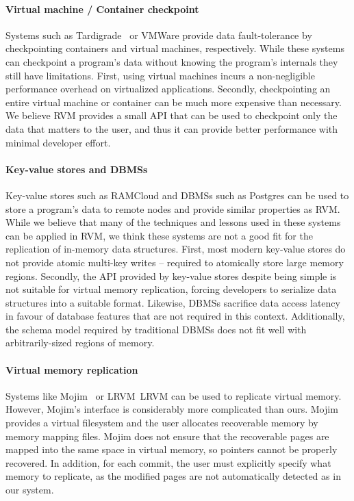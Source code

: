 \paragraph {\bf Virtual machine / Container checkpoint} Systems such as
Tardigrade~\cite{Tardigrade} or VMWare provide data fault-tolerance by
checkpointing containers and virtual machines, respectively.  While these
systems can checkpoint a program's data without knowing the program's internals
they still have limitations.  First, using virtual machines incurs a
non-negligible performance overhead on virtualized applications. Secondly,
checkpointing an entire virtual machine or container can be much more expensive
than necessary.  We believe RVM provides a small API that can be used to
checkpoint only the data that matters to the user, and thus it can provide
better performance with minimal developer effort.

\paragraph {\bf Key-value stores and DBMSs} Key-value stores such as RAMCloud
and DBMSs such as Postgres can be used to store a program's data to remote
nodes and provide similar properties as RVM. While we believe that many of the
techniques and lessons used in these systems can be applied in RVM, we think
these systems are not a good fit for the replication of in-memory data
structures.  First, most modern key-value stores do not provide atomic
multi-key writes -- required to atomically store large memory regions.
Secondly, the API provided by key-value stores despite being simple is not
suitable for virtual memory replication, forcing developers to serialize data
structures into a suitable format.  Likewise, DBMSs sacrifice data access
latency in favour of database features that are not required in this context.
Additionally, the schema model required by traditional DBMSs does not fit well
with arbitrarily-sized regions of memory.

\paragraph {\bf Virtual memory replication} Systems like Mojim~\cite{Mojim} or
LRVM~{LRVM} can be used to replicate virtual memory. However, Mojim's interface
is considerably more complicated than ours. Mojim provides a virtual filesystem
and the user allocates recoverable memory by memory mapping files. Mojim does
not ensure that the recoverable pages are mapped into the same space in virtual
memory, so pointers cannot be properly recovered. In addition, for each commit,
the user must explicitly specify what memory to replicate, as the modified
pages are not automatically detected as in our system.
